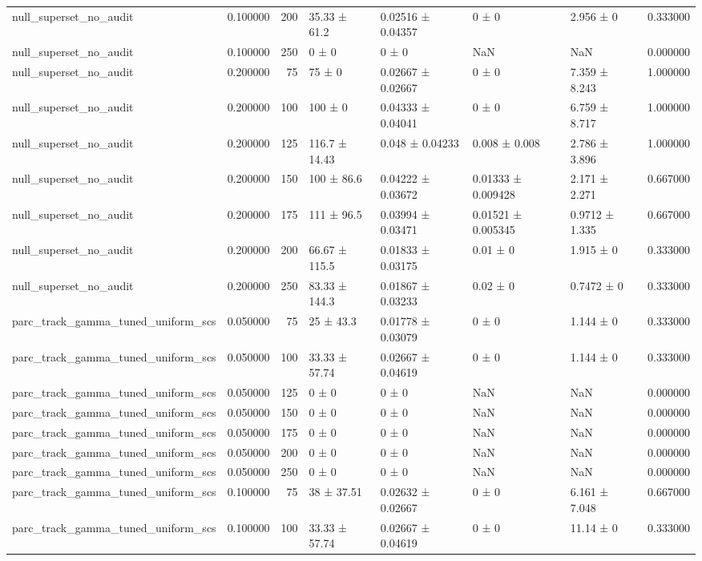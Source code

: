 \begin{tabular}{lrrllllr}
null_superset_no_audit & 0.100000 & 200 & 35.33 ± 61.2 & 0.02516 ± 0.04357 & 0 ± 0 & 2.956 ± 0 & 0.333000 \\
null_superset_no_audit & 0.100000 & 250 & 0 ± 0 & 0 ± 0 & NaN & NaN & 0.000000 \\
null_superset_no_audit & 0.200000 & 75 & 75 ± 0 & 0.02667 ± 0.02667 & 0 ± 0 & 7.359 ± 8.243 & 1.000000 \\
null_superset_no_audit & 0.200000 & 100 & 100 ± 0 & 0.04333 ± 0.04041 & 0 ± 0 & 6.759 ± 8.717 & 1.000000 \\
null_superset_no_audit & 0.200000 & 125 & 116.7 ± 14.43 & 0.048 ± 0.04233 & 0.008 ± 0.008 & 2.786 ± 3.896 & 1.000000 \\
null_superset_no_audit & 0.200000 & 150 & 100 ± 86.6 & 0.04222 ± 0.03672 & 0.01333 ± 0.009428 & 2.171 ± 2.271 & 0.667000 \\
null_superset_no_audit & 0.200000 & 175 & 111 ± 96.5 & 0.03994 ± 0.03471 & 0.01521 ± 0.005345 & 0.9712 ± 1.335 & 0.667000 \\
null_superset_no_audit & 0.200000 & 200 & 66.67 ± 115.5 & 0.01833 ± 0.03175 & 0.01 ± 0 & 1.915 ± 0 & 0.333000 \\
null_superset_no_audit & 0.200000 & 250 & 83.33 ± 144.3 & 0.01867 ± 0.03233 & 0.02 ± 0 & 0.7472 ± 0 & 0.333000 \\
parc_track_gamma_tuned_uniform_scs & 0.050000 & 75 & 25 ± 43.3 & 0.01778 ± 0.03079 & 0 ± 0 & 1.144 ± 0 & 0.333000 \\
parc_track_gamma_tuned_uniform_scs & 0.050000 & 100 & 33.33 ± 57.74 & 0.02667 ± 0.04619 & 0 ± 0 & 1.144 ± 0 & 0.333000 \\
parc_track_gamma_tuned_uniform_scs & 0.050000 & 125 & 0 ± 0 & 0 ± 0 & NaN & NaN & 0.000000 \\
parc_track_gamma_tuned_uniform_scs & 0.050000 & 150 & 0 ± 0 & 0 ± 0 & NaN & NaN & 0.000000 \\
parc_track_gamma_tuned_uniform_scs & 0.050000 & 175 & 0 ± 0 & 0 ± 0 & NaN & NaN & 0.000000 \\
parc_track_gamma_tuned_uniform_scs & 0.050000 & 200 & 0 ± 0 & 0 ± 0 & NaN & NaN & 0.000000 \\
parc_track_gamma_tuned_uniform_scs & 0.050000 & 250 & 0 ± 0 & 0 ± 0 & NaN & NaN & 0.000000 \\
parc_track_gamma_tuned_uniform_scs & 0.100000 & 75 & 38 ± 37.51 & 0.02632 ± 0.02667 & 0 ± 0 & 6.161 ± 7.048 & 0.667000 \\
parc_track_gamma_tuned_uniform_scs & 0.100000 & 100 & 33.33 ± 57.74 & 0.02667 ± 0.04619 & 0 ± 0 & 11.14 ± 0 & 0.333000 \\

\end{tabular}
